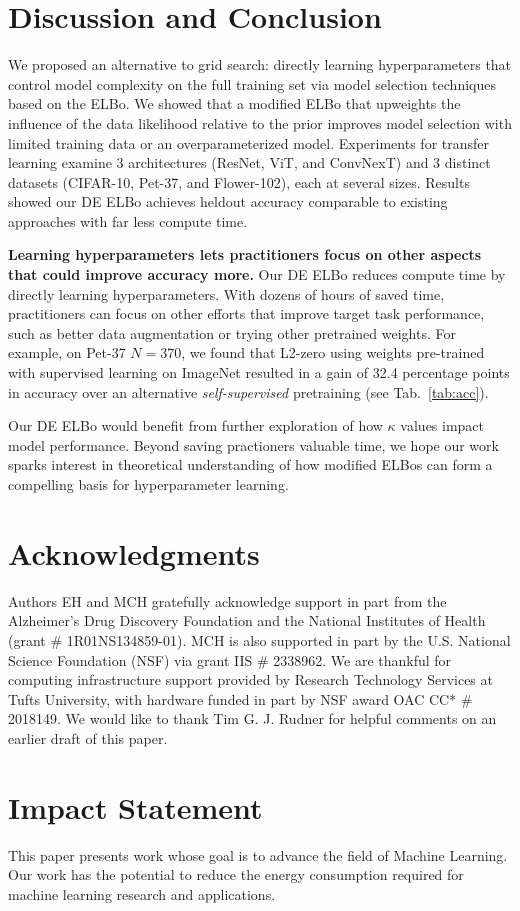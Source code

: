 \section{Discussion and Conclusion}

We proposed an alternative to grid search: directly learning hyperparameters that control model complexity on the full training set via model selection techniques based on the ELBo.
We showed that a modified ELBo that upweights the influence of the data likelihood relative to the prior improves model selection with limited training data or an overparameterized model.
Experiments for transfer learning examine 3 architectures (ResNet, ViT, and ConvNexT) and 3 distinct datasets (CIFAR-10, Pet-37, and Flower-102), each at several sizes. 
Results showed our DE ELBo achieves heldout accuracy comparable to existing approaches with far less compute time.

\textbf{Learning hyperparameters lets practitioners focus on other aspects that could improve accuracy more.}
Our DE ELBo reduces compute time by directly learning hyperparameters. With dozens of hours of saved time, practitioners can focus on other efforts that improve target task performance, such as better data augmentation or trying other pretrained weights.
For example, on Pet-37 $N=370$, we found that L2-zero using weights pre-trained with supervised learning on ImageNet resulted in a gain of 32.4 percentage points in accuracy over an alternative \emph{self-supervised} pretraining (see Tab.~\ref{tab:acc}).

Our DE ELBo would benefit from further exploration of how $\kappa$ values impact model performance.
Beyond saving practioners valuable time, we hope our work sparks interest in theoretical understanding of how modified ELBos can form a compelling basis for hyperparameter learning.

\section*{Acknowledgments}
Authors EH and MCH gratefully acknowledge support in part from the Alzheimer’s Drug Discovery Foundation and the National Institutes of Health (grant \# 1R01NS134859-01). MCH is also supported in part by the U.S. National Science Foundation (NSF) via grant IIS \# 2338962. We are thankful for computing infrastructure support provided by Research Technology Services at Tufts University, with hardware funded in part by NSF award OAC CC* \# 2018149. We would like to thank Tim G. J. Rudner for helpful comments on an earlier draft of this paper.

\section*{Impact Statement}
This paper presents work whose goal is to advance the field of Machine Learning.
Our work has the potential to reduce the energy consumption required for machine learning research and applications.
